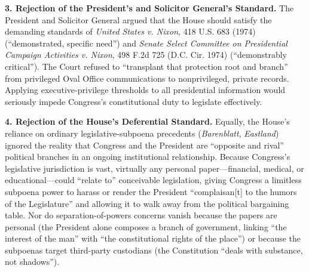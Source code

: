 \documentclass[12pt]{article}
\begin{document}
\textbf{3. Rejection of the President's and Solicitor General's Standard.} The President and Solicitor General argued that the House should satisfy the demanding standards of \textit{United States v. Nixon}, 418 U.S. 683 (1974) (``demonstrated, specific need'') and \textit{Senate Select Committee on Presidential Campaign Activities v. Nixon}, 498 F.2d 725 (D.C. Cir. 1974) (``demonstrably critical''). The Court refused to ``transplant that protection root and branch'' from privileged Oval Office communications to nonprivileged, private records. Applying executive-privilege thresholds to all presidential information would seriously impede Congress's constitutional duty to legislate effectively.

\textbf{4. Rejection of the House's Deferential Standard.} Equally, the House's reliance on ordinary legislative-subpoena precedents (\textit{Barenblatt}, \textit{Eastland}) ignored the reality that Congress and the President are ``opposite and rival'' political branches in an ongoing institutional relationship. Because Congress's legislative jurisdiction is vast, virtually any personal paper---financial, medical, or educational---could ``relate to'' conceivable legislation, giving Congress a limitless subpoena power to harass or render the President ``complaisan[t] to the humors of the Legislature'' and allowing it to walk away from the political bargaining table. Nor do separation-of-powers concerns vanish because the papers are personal (the President alone composes a branch of government, linking ``the interest of the man'' with ``the constitutional rights of the place'') or because the subpoenas target third-party custodians (the Constitution ``deals with substance, not shadows'').
\end{document}
